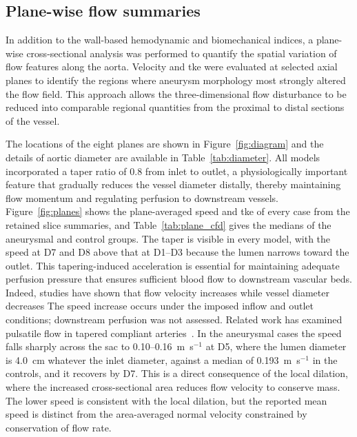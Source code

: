 \documentclass[12pt,a4paper]{article}
\newcommand{\cfdrevision}[1]{#1} %
\newcommand{\TKE}{\ac{tke}\xspace}
\theoremstyle{definition}
\numberwithin{equation}{section}
\providecommand{\DIFaddtex}[1]{{\protect\color{blue} \sf #1}} %
\providecommand{\DIFdeltex}[1]{{\protect\color{red} \scriptsize #1}} %
\providecommand{\DIFaddbegin}{} %
\providecommand{\DIFaddend}{} %
\providecommand{\DIFdelbegin}{} %
\providecommand{\DIFdelend}{} %
\providecommand{\DIFadd}[1]{\texorpdfstring{\DIFaddtex{#1}}{#1}} %
\providecommand{\DIFdel}[1]{\texorpdfstring{\DIFdeltex{#1}}{}} %
\newcommand{\DIFscaledelfig}{0.5}
\newlength{\DIFdelgraphicswidth} %
\newlength{\DIFdelgraphicsheight} %
\newcommand{\DIFaddincludegraphics}[2][]{{\color{blue}\fbox{\DIFOincludegraphics[#1]{#2}}}} %
\newcommand{\DIFdelincludegraphics}[2][]{%
\sbox{\DIFdelgraphicsbox}{\DIFOincludegraphics[#1]{#2}}%
\settoboxwidth{\DIFdelgraphicswidth}{\DIFdelgraphicsbox} %
\settoboxtotalheight{\DIFdelgraphicsheight}{\DIFdelgraphicsbox} %
\scalebox{\DIFscaledelfig}{%
\parbox[b]{\DIFdelgraphicswidth}{\usebox{\DIFdelgraphicsbox}\\[-\baselineskip] \rule{\DIFdelgraphicswidth}{0em}}\llap{\resizebox{\DIFdelgraphicswidth}{\DIFdelgraphicsheight}{%
\setlength{\unitlength}{\DIFdelgraphicswidth}%
\begin{picture}(1,1)%
\thicklines\linethickness{2pt} %
{\color[rgb]{1,0,0}\put(0,0){\framebox(1,1){}}}%
{\color[rgb]{1,0,0}\put(0,0){\line( 1,1){1}}}%
{\color[rgb]{1,0,0}\put(0,1){\line(1,-1){1}}}%
\end{picture}%
}\hspace*{3pt}}} %
} %
\DeclareRobustCommand{\DIFaddbegin}{\DIFOaddbegin \let\includegraphics\DIFaddincludegraphics} %
\DeclareRobustCommand{\DIFaddend}{\DIFOaddend \let\includegraphics\DIFOincludegraphics} %
\DeclareRobustCommand{\DIFdelbegin}{\DIFOdelbegin \let\includegraphics\DIFdelincludegraphics} %
\DeclareRobustCommand{\DIFdelend}{\DIFOaddend \let\includegraphics\DIFOincludegraphics} %
\begin{document}



\DIFdelbegin %

\DIFdelend \subsection{Plane-wise flow summaries}
\label{sec:planes}

In addition to the wall-based hemodynamic and biomechanical indices, a plane-wise cross-sectional analysis was performed to quantify the spatial variation of flow features along the aorta. Velocity and \TKE were evaluated at selected axial planes to identify the regions where aneurysm morphology most strongly altered the flow field. This approach allows the three-dimensional flow disturbance to be reduced into comparable regional quantities from the proximal to distal sections of the vessel.

The locations of the eight planes are shown in Figure~\ref{fig:diagram} and the details of aortic diameter are available in Table~\ref{tab:diameter}. All models incorporated a taper ratio of 0.8 from inlet to outlet, a physiologically important feature that gradually reduces the vessel diameter distally, thereby maintaining flow momentum and regulating perfusion to downstream vessels. Figure~\ref{fig:planes} shows the plane-averaged speed and \TKE of every case from the retained slice summaries, and Table~\ref{tab:plane_cfd} gives the medians of the aneurysmal and control groups. The taper is visible in every model, with the speed at D7 and D8 above that at D1--D3 because the lumen narrows toward the outlet. \DIFdelbegin \DIFdel{This tapering-induced acceleration is essential for maintaining adequate perfusion pressure that ensures sufficient blood flow to downstream vascular beds. Indeed, studies have shown that flow velocity increases while vessel diameter decreases}\DIFdelend \DIFaddbegin \DIFadd{\cfdrevision{The speed increase occurs under the imposed inflow and outlet conditions; downstream perfusion was not assessed.} Related work has examined pulsatile flow in tapered compliant arteries}\DIFaddend ~\cite{kahveci2015numerical}. In the aneurysmal cases the speed falls sharply across the sac to 0.10--0.16~m~s$^{-1}$ at D5, where the lumen diameter is 4.0~cm whatever the inlet diameter, against a median of 0.193~m~s$^{-1}$ in the controls, and it recovers by D7. \DIFdelbegin \DIFdel{This is a direct consequence of the local dilation, where the increased cross-sectional area reduces flow velocity to conserve mass.
}\DIFdelend \DIFaddbegin \DIFadd{\cfdrevision{The lower speed is consistent with the local dilation, but the reported mean speed is distinct from the area-averaged normal velocity constrained by conservation of flow rate.}
}\DIFaddend 
\end{document}
